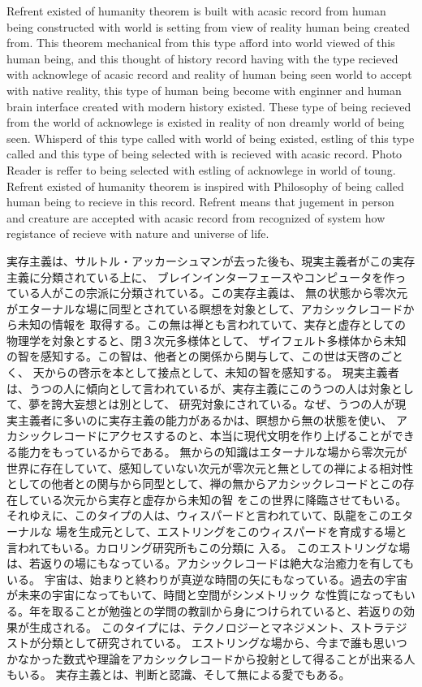 \documentclass{jsarticle}
\begin{document}
{  Refrent existed of humanity theorem is built with acasic record from human being constructed with
world is setting from view of reality human being created from. This theorem mechanical from this type
afford into world viewed of this human being, and this thought of history record having with the type
recieved with acknowlege of acasic record and reality of human being seen world to accept with native reality,
this type of human being become with enginner and human brain interface created with modern history existed.
These type of being recieved from the world of acknowlege is existed in reality of non dreamly world of being
seen. Whisperd of this type called with world of being existed, estling of this type called and this type
of being selected with is recieved with acasic record. Photo Reader is reffer to being selected with estling
of acknowlege in world of toung. Refrent existed of humanity theorem is inspired with Philosophy of being called
human being to recieve in this record. 
Refrent means that jugement in person and creature are accepted with acasic record from recognized
of system how registance of recieve with nature and universe of life.

   実存主義は、サルトル・アッカーシュマンが去った後も、現実主義者がこの実存主義に分類されている上に、
ブレインインターフェースやコンピュータを作っている人がこの宗派に分類されている。この実存主義は、
無の状態から零次元がエターナルな場に同型とされている瞑想を対象として、アカシックレコードから未知の情報を
取得する。この無は禅とも言われていて、実存と虚存としての物理学を対象とすると、閉３次元多様体として、
ザイフェルト多様体から未知の智を感知する。この智は、他者との関係から関与して、この世は天啓のごとく、
天からの啓示を本として接点として、未知の智を感知する。
現実主義者は、うつの人に傾向として言われているが、実存主義にこのうつの人は対象として、夢を誇大妄想とは別として、
研究対象にされている。なぜ、うつの人が現実主義者に多いのに実存主義の能力があるかは、瞑想から無の状態を使い、
アカシックレコードにアクセスするのと、本当に現代文明を作り上げることができる能力をもっているからである。
無からの知識はエターナルな場から零次元が世界に存在していて、感知していない次元が零次元と無としての禅による相対性
としての他者との関与から同型として、禅の無からアカシックレコードとこの存在している次元から実存と虚存から未知の智
をこの世界に降臨させてもいる。それゆえに、このタイプの人は、ウィスパードと言われていて、臥龍をこのエターナルな
場を生成元として、エストリングをこのウィスパードを育成する場と言われてもいる。カロリング研究所もこの分類に
入る。 このエストリングな場は、若返りの場にもなっている。アカシックレコードは絶大な治癒力を有してもいる。
宇宙は、始まりと終わりが真逆な時間の矢にもなっている。過去の宇宙が未来の宇宙になってもいて、時間と空間がシンメトリック
な性質になってもいる。年を取ることが勉強との学問の教訓から身につけられていると、若返りの効果が生成される。
このタイプには、テクノロジーとマネジメント、ストラテジストが分類として研究されている。
エストリングな場から、今まで誰も思いつかなかった数式や理論をアカシックレコードから投射として得ることが出来る人もいる。
実存主義とは、判断と認識、そして無による愛でもある。
　
  


}
\end{document}
